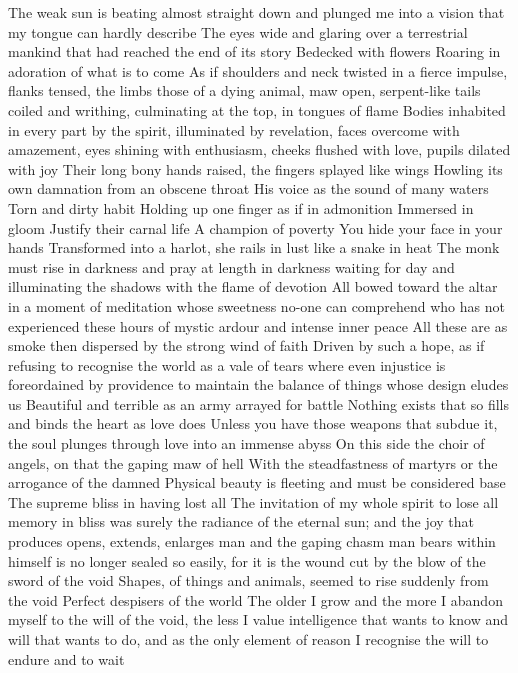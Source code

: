 \documentclass{article}
\begin{document}
\iffalse
The weak sun is beating almost straight down and plunged me into a vision that my tongue can hardly describe
The eyes wide and glaring over a terrestrial mankind that had reached the end of its story
Bedecked with flowers
Roaring in adoration of what is to come
As if shoulders and neck twisted in a fierce impulse, flanks tensed, the limbs those of a dying animal, maw open, serpent-like tails coiled and writhing, culminating at the top, in tongues of flame
Bodies inhabited in every part by the spirit, illuminated by revelation, faces overcome with amazement, eyes shining with enthusiasm, cheeks flushed with love, pupils dilated with joy
Their long bony hands raised, the fingers splayed like wings
Howling its own damnation from an obscene throat
His voice as the sound of many waters
Torn and dirty habit
Holding up one finger as if in admonition
Immersed in gloom
Justify their carnal life
A champion of poverty
You hide your face in your hands
Transformed into a harlot, she rails in lust like a snake in heat
The monk must rise in darkness and pray at length in darkness waiting for day and illuminating the shadows with the flame of devotion
All bowed toward the altar in a moment of meditation whose sweetness no-one can comprehend who has not experienced these hours of mystic ardour and intense inner peace
All these are as smoke then dispersed by the strong wind of faith
Driven by such a hope, as if refusing to recognise the world as a vale of tears where even injustice is foreordained by providence to maintain the balance of things whose design eludes us
Beautiful and terrible as an army arrayed for battle
Nothing exists that so fills and binds the heart as love does
Unless you have those weapons that subdue it, the soul plunges through love into an immense abyss
On this side the choir of angels, on that the gaping maw of hell
With the steadfastness of martyrs or the arrogance of the damned
Physical beauty is fleeting and must be considered base
The supreme bliss in having lost all
The invitation of my whole spirit to lose all memory in bliss was surely the radiance of the eternal sun; and the joy that produces opens, extends, enlarges man and the gaping chasm man bears within himself is no longer sealed so easily, for it is the wound cut by the blow of the sword of the void
Shapes, of things and animals, seemed to rise suddenly from the void
Perfect despisers of the world
The older I grow and the more I abandon myself to the will of the void, the less I value intelligence that wants to know and will that wants to do, and as the only element of reason I recognise the will to endure and to wait
\end{document}
